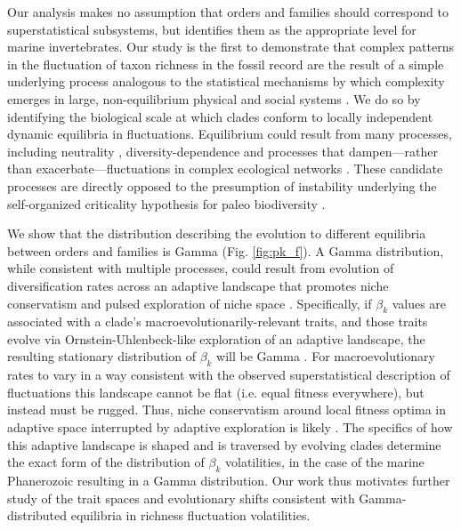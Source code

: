 \documentclass[12pt]{article}
\let\citep=\cite
\begin{document}
Our analysis makes no assumption that orders and families should
correspond to superstatistical subsystems, but identifies them as the
appropriate level for marine invertebrates. Our study is the first to
demonstrate that complex patterns in the fluctuation of taxon richness
in the fossil record are the result of a simple underlying process
analogous to the statistical mechanisms by which complexity emerges in
large, non-equilibrium physical \citep{beck2004} and social systems
\citep{fuentes2009}.  We do so by identifying the biological scale at
which clades conform to locally independent dynamic equilibria in
fluctuations.  Equilibrium could result from many processes, including
neutrality \citep{macWilson, hubbell2001}, diversity-dependence
\citep{moen2014, foote2018} and processes that dampen---rather than
exacerbate---fluctuations in complex ecological networks
\citep{berlow2009}. These candidate processes are directly opposed to
the presumption of instability underlying the self-organized
criticality hypothesis for paleo biodiversity \citep{bak1993,
  sole1997}.

We show that the distribution describing the evolution to different
equilibria between orders and families is Gamma (Fig. \ref{fig:pk_f}).
A Gamma distribution, while consistent with multiple processes, could
result from evolution of diversification rates across an adaptive
landscape that promotes niche conservatism and pulsed exploration of
niche space \citep{cir1985}.  Specifically, if $\beta_k$ values are
associated with a clade's macroevolutionarily-relevant traits, and
those traits evolve via Ornstein-Uhlenbeck-like exploration of an
adaptive landscape, the resulting stationary distribution of $\beta_k$
will be Gamma \citep{cir1985}. For macroevolutionary rates to vary in
a way consistent with the observed superstatistical description of
fluctuations this landscape cannot be flat (i.e. equal fitness
everywhere), but instead must be rugged. Thus, niche conservatism
around local fitness optima in adaptive space interrupted by adaptive
exploration is likely \citep{newman1985adaptive,
  gavrilets2004book}. The specifics of how this adaptive landscape is
shaped and is traversed by evolving clades determine the exact form of
the distribution of $\beta_k$ volatilities, in the case of the marine
Phanerozoic resulting in a Gamma distribution. Our work thus motivates
further study of the trait spaces and evolutionary shifts consistent
with Gamma-distributed equilibria in richness fluctuation
volatilities.
\end{document}
